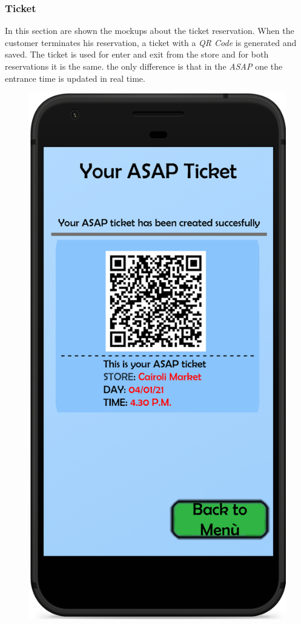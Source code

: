 \documentclass{article}
\begin{document}
		\subsubsection{Ticket}
		In this section are shown the mockups about the ticket reservation. When the customer terminates his reservation, a ticket with a \emph{QR Code} is generated and saved. The ticket is used for enter and exit from the store and for both reservations it is the same. the only difference is that in the \emph{ASAP} one the entrance time is updated in real time.
		\bigskip
		\bigskip
		\begin{figure}[!h]
			\centering
			\begin{minipage}[!h]{0.4\textwidth}
				\includegraphics[width=\textwidth]{../Mockups/ASAPTicket.png}

\end{minipage}
\end{figure}
\end{document}
